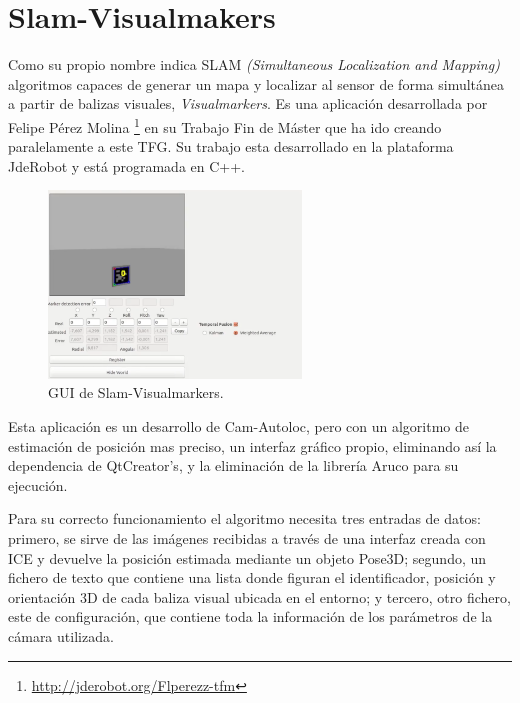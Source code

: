 \section{Slam-Visualmakers}
\hspace{1cm} Como su propio nombre indica SLAM \textit{(Simultaneous Localization and Mapping)} algoritmos capaces de generar un mapa y localizar al sensor de forma simultánea a partir de balizas visuales, \textit{Visualmarkers}. Es una aplicación desarrollada por Felipe Pérez Molina \footnote{\url{http://jderobot.org/Flperezz-tfm}} en su Trabajo Fin de Máster que ha ido creando paralelamente a este TFG. Su trabajo esta desarrollado en la plataforma JdeRobot y está programada en C++. 

\begin{figure}[H]
	\begin{center}
		\includegraphics[width=0.6\textwidth]{imag/IMG24.png}
				\caption{GUI de Slam-Visualmarkers.} 
	\label{fig:GUI de Slam-Visualmarkers.}	
	\end{center}
\end{figure}

\hspace{1cm} Esta aplicación es un desarrollo de Cam-Autoloc, pero con un algoritmo de estimación de posición mas preciso, un interfaz gráfico propio, eliminando así la dependencia de QtCreator's, y la eliminación de la librería Aruco para su ejecución. 

\hspace{1cm} Para su correcto funcionamiento el algoritmo necesita tres entradas de datos: primero, se sirve de las imágenes recibidas a través de una interfaz creada con ICE y devuelve la posición estimada mediante un objeto Pose3D; segundo, un fichero de texto que contiene una lista donde figuran el identificador, posición y orientación 3D de cada baliza visual ubicada en el entorno; y tercero, otro fichero, este de configuración, que contiene toda la información de los parámetros de la cámara utilizada. 

